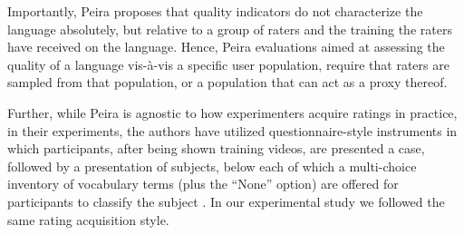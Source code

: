Importantly, Peira proposes that quality indicators do not characterize the language absolutely, but relative to a group of raters and the training the raters have received on the language. Hence, Peira evaluations aimed at assessing the quality of a language vis-\`{a}-vis a specific user population, require that raters are sampled from that population, or a population that can act as a proxy thereof.

Further, while Peira is agnostic to how experimenters acquire ratings in practice, in their experiments, the authors have utilized questionnaire-style instruments in which participants, after being shown training videos, are presented a case, followed by a presentation of subjects, below each of which a multi-choice inventory of vocabulary terms (plus the ``None'' option) are offered for participants to classify the subject \cite{LZMK.24}. In our experimental study we followed the same rating acquisition style.

